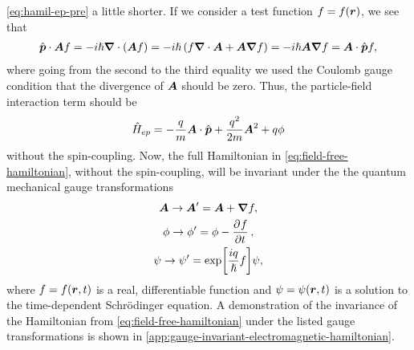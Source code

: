             \autoref{eq:hamil-ep-pre} a little shorter.
            If we consider a test function $f = f(\boldsymbol{r})$, we see that
            \begin{align}
                \hat{\boldsymbol{p}}\cdot\boldsymbol{A}f
                = -i\hslash\boldsymbol{\nabla}\cdot\left( 
                    \boldsymbol{A}f
                 \right)
                = -i\hslash\left( 
                    f\boldsymbol{\nabla}\cdot\boldsymbol{A}
                    + \boldsymbol{A}\boldsymbol{\nabla}f
                 \right)
                = -i\hslash\boldsymbol{A}\boldsymbol{\nabla}f
                = \boldsymbol{A}\cdot \hat{\boldsymbol{p}} f,
            \end{align}
            where going from the second to the third equality we used the
            Coulomb gauge condition that the divergence of $\boldsymbol{A}$ should be
            zero.
            Thus, the particle-field interaction term should be
            \begin{align}
                \hat{H}_{ep}
                =
                -\frac{q}{m}\boldsymbol{A}\cdot\hat{\boldsymbol{p}}
                + \frac{q^2}{2m}
                \boldsymbol{A}^2
                + q\phi
                \label{eq:hamil-ep}
            \end{align}
            without the spin-coupling.
            Now, the full Hamiltonian in \autoref{eq:field-free-hamiltonian},
            without the spin-coupling, will be invariant under the the quantum
            mechanical gauge transformations
            \cite{joachain2012atoms}
            \begin{gather}
                \vfg{A} \to \vfg{A}' = \vfg{A} + \vfg{\nabla}f,
                \label{eq:gauge-invariant-vector-potential}
                \\
                \phi \to \phi' = \phi - \dpd{f}{t},
                \label{eq:gauge-invariant-scalar-potential}
                \\
                \psi \to \psi' = \exp[\frac{iq}{\hslash}f]\psi,
                \label{eq:gauge-invariant-wave-function}
            \end{gather}
            where $f = f(\boldsymbol{r}, t)$ is a real, differentiable function and
            $\psi = \psi(\boldsymbol{r}, t)$ is a solution to the time-dependent
            Schrödinger equation.
            A demonstration of the invariance of the Hamiltonian from
            \autoref{eq:field-free-hamiltonian} under the listed gauge
            transformations is shown in
            \autoref{app:gauge-invariant-electromagnetic-hamiltonian}.

